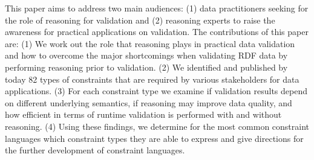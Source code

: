 \documentclass{acm_proc_article-sp}
\begin{document}


This paper aims to address two main audiences: 
(1) data practitioners seeking for the role of reasoning for validation and
(2) reasoning experts to raise the awareness for practical applications on validation.
The contributions of this paper are:
(1) We work out the role that reasoning plays in practical data validation and 
how to overcome the major shortcomings when validating RDF data by performing reasoning prior to validation. 
(2) We identified and published by today 82 types of constraints that are required by various stakeholders for data applications. 
(3) For each constraint type we examine if validation results depend on different underlying semantics,
    if reasoning may improve data quality, and 
    how efficient in terms of runtime validation is performed with and without reasoning.
(4) Using these findings, we determine for the most common constraint languages which constraint types they are able to express
    and give directions for the further development of constraint languages.
\end{document}
